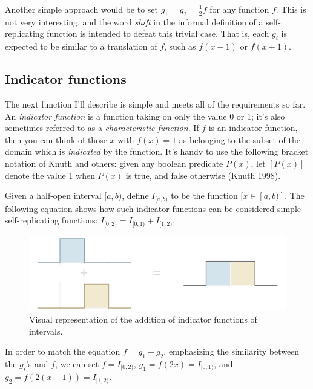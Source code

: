 \documentclass[20pt,]{extarticle}
\begin{document}
Another simple approach would be to set \(g_1 = g_2 = \frac{1}{2}f\) for
any function \(f\). This is not very interesting, and the word
\emph{shift} in the informal definition of a self-replicating function
is intended to defeat this trivial case. That is, each \(g_i\) is
expected to be similar to a translation of \(f\), such as \(f(x-1)\) or
\(f(x+1)\).

\subsection{Indicator functions}\label{indicator-functions}

The next function I'll describe is simple and meets all of the
requirements so far. An \emph{indicator function} is a function taking
on only the value 0 or 1; it's also sometimes referred to as a
\emph{characteristic function}. If \(f\) is an indicator function, then
you can think of those \(x\) with \(f(x) = 1\) as belonging to the
subset of the domain which is \emph{indicated} by the function. It's
handy to use the following bracket notation of Knuth and others: given
any boolean predicate \(P(x)\), let \([P(x)]\) denote the value 1 when
\(P(x)\) is true, and false otherwise (Knuth 1998).

Given a half-open interval \([a, b)\), define \(I_{[a, b)}\) to be the
function \([x\in[a, b)]\). The following equation shows how such
indicator functions can be considered simple self-replicating functions:
\(I_{[0, 2)} = I_{[0, 1)} + I_{[1, 2)}\).

\begin{figure}[htbp]
\centering
\includegraphics{images/added_intervals6.png}
\caption{\label{fig:added_intervals}Visual representation of the
addition of indicator functions of
intervals.}\label{fig:addedux5fintervals}
\end{figure}

In order to match the equation \(f = g_1 + g_2\), emphasizing the
similarity between the \(g_i\)'s and \(f\), we can set
\(f = I_{[0, 2)}\), \(g_1 = f(2x) = I_{[0, 1)}\), and
\(g_2 = f(2(x - 1)) = I_{[1, 2)}\).
\end{document}
